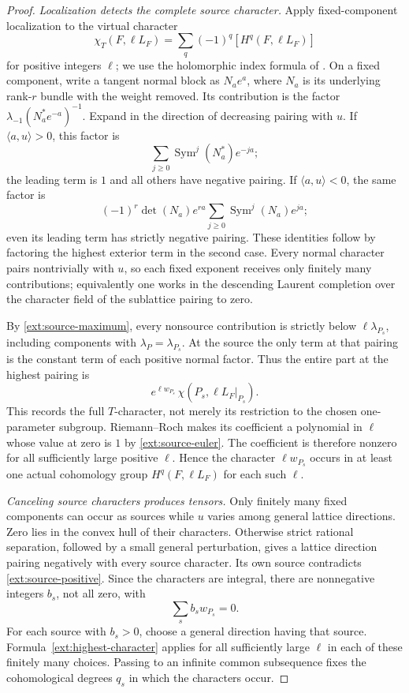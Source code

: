 \begin{proof}
\emph{Localization detects the complete source character.}
Apply fixed-component localization to the virtual character
\[
 \chi_T(F,\ell L_F)=
       \sum_q(-1)^q[H^q(F,\ell L_F)]
\]
for positive integers $\ell$; we use the holomorphic index formula
of \cite{AtiyahSegal1968,AtiyahSinger1968}.  On a fixed component,
write a tangent normal block as $N_a e^a$, where $N_a$ is its
underlying rank-$r$ bundle with the weight removed.  Its contribution
is the factor $\lambda_{-1}(N_a^*e^{-a})^{-1}$.  Expand in the
direction of decreasing pairing with $u$.  If
$\langle a,u\rangle>0$, this factor is
\[
 \sum_{j\geq0}\operatorname{Sym}^j(N_a^*)e^{-ja};
\]
the leading term is $1$ and all others have negative pairing.
If $\langle a,u\rangle<0$, the same factor is
\[
 (-1)^r\det(N_a)e^{ra}
       \sum_{j\geq0}\operatorname{Sym}^j(N_a)e^{ja};
\]
even its leading term has strictly negative pairing.  These
identities follow by factoring the highest exterior term in the
second case.  Every normal character pairs nontrivially with $u$,
so each fixed exponent receives only finitely many contributions;
equivalently one works in the descending Laurent completion over
the character field of the sublattice pairing to zero.

By \eqref{ext:source-maximum}, every nonsource contribution is
strictly below $\ell\lambda_{P_s}$, including components with
$\lambda_P=\lambda_{P_s}$.  At the source the only term at that
pairing is the constant term of each positive normal factor.
Thus the entire part at the highest pairing is
\begin{equation}\label{ext:highest-character}
 e^{\ell w_{P_s}}\,
       \chi(P_s,\ell L_F|_{P_s}).
\end{equation}
This records the full $T$-character, not merely its restriction
to the chosen one-parameter subgroup.  Riemann--Roch makes its
coefficient a polynomial in $\ell$ whose value at zero is $1$
by \eqref{ext:source-euler}.  The coefficient is therefore
nonzero for all sufficiently large positive $\ell$.  Hence the
character $\ell w_{P_s}$ occurs in at least one actual cohomology
group $H^q(F,\ell L_F)$ for each such $\ell$.

\emph{Canceling source characters produces tensors.}
Only finitely many fixed components can occur as sources while
$u$ varies among general lattice directions.  Zero lies in the
convex hull of their characters.  Otherwise strict rational
separation, followed by a small general perturbation, gives a
lattice direction pairing negatively with every source character.
Its own source contradicts \eqref{ext:source-positive}.  Since
the characters are integral, there are nonnegative integers $b_s$,
not all zero, with
\begin{equation}\label{ext:cancel}
 \sum_s b_sw_{P_s}=0.
\end{equation}
For each source with $b_s>0$, choose a general direction having
that source.  Formula~\eqref{ext:highest-character} applies for
all sufficiently large $\ell$ in each of these finitely many
choices.  Passing to an infinite common subsequence fixes the
cohomological degrees $q_s$ in which the characters occur.


\end{proof}
